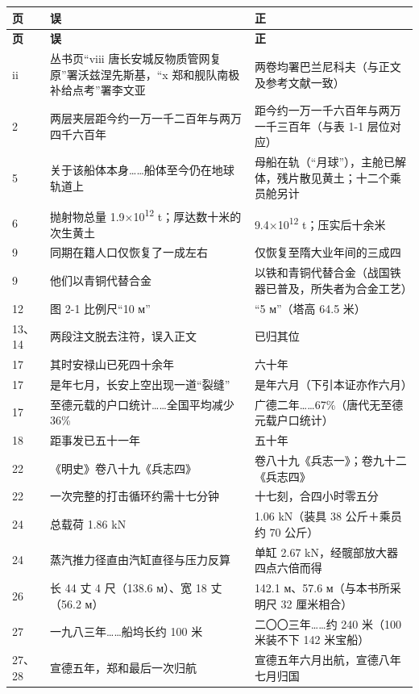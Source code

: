 \vspace{4mm}
{\footnotesize
\renewcommand{\arraystretch}{1.22}
\begin{longtable}{@{}p{17mm}p{58mm}p{58mm}@{}}
\toprule
\textbf{页} & \textbf{误} & \textbf{正}\\
\midrule
\endfirsthead
\toprule
\textbf{页} & \textbf{误} & \textbf{正}\\
\midrule
\endhead
\bottomrule
\endfoot
ii & 丛书页“viii 唐长安城反物质管网复原”署沃兹涅先斯基，“x 郑和舰队南极补给点考”署李文亚 & 两卷均署巴兰尼科夫（与正文及参考文献一致）\\
2 & 两层夹层距今约一万一千二百年与两万四千六百年 & 距今约一万一千六百年与两万一千三百年（与表 1-1 层位对应）\\
5 & 关于该船体本身……船体至今仍在地球轨道上 & 母船在轨（“月球”），主舱已解体，残片散见黄土；十二个乘员舱另计\\
6 & 抛射物总量 1.9×10\textsuperscript{12} t；厚达数十米的次生黄土 & 9.4×10\textsuperscript{12} t；压实后十余米\\
9 & 同期在籍人口仅恢复了一成左右 & 仅恢复至隋大业年间的三成四\\
9 & 他们以青铜代替合金 & 以铁和青铜代替合金（战国铁器已普及，所失者为合金工艺）\\
12 & 图 2-1 比例尺“10 м” & “5 м”（塔高 64.5 米）\\
13、14 & 两段注文脱去注符，误入正文 & 已归其位\\
17 & 其时安禄山已死四十余年 & 六十年\\
17 & 是年七月，长安上空出现一道“裂缝” & 是年六月（下引本证亦作六月）\\
17 & 至德元载的户口统计……全国平均减少 36\% & 广德二年……67\%（唐代无至德元载户口统计）\\
18 & 距事发已五十一年 & 五十年\\
22 & 《明史》卷八十九《兵志四》 & 卷八十九《兵志一》；卷九十二《兵志四》\\
22 & 一次完整的打击循环约需十七分钟 & 十七刻，合四小时零五分\\
24 & 总载荷 1.86 kN & 1.06 kN（装具 38 公斤＋乘员约 70 公斤）\\
24 & 蒸汽推力径直由汽缸直径与压力反算 & 单缸 2.67 kN，经髋部放大器四点六倍而得\\
26 & 长 44 丈 4 尺（138.6 м）、宽 18 丈（56.2 м） & 142.1 м、57.6 м（与本书所采明尺 32 厘米相合）\\
27 & 一九八三年……船坞长约 100 米 & 二〇〇三年……约 240 米（100 米装不下 142 米宝船）\\
27、28 & 宣德五年，郑和最后一次归航 & 宣德五年六月出航，宣德八年七月归国\\

\end{longtable}}
